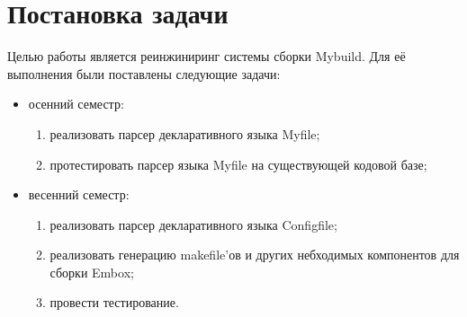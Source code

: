 
\section{Постановка задачи}
\label{sec:task}
Целью работы является реинжиниринг системы сборки Mybuild. Для её выполнения были поставлены следующие задачи:
\begin{itemize}
	\item осенний семестр: \begin{enumerate}
		      \item реализовать парсер декларативного языка Myfile;
		      \item протестировать парсер языка Myfile на существующей кодовой базе;
	      \end{enumerate}
	\item весенний семестр: \begin{enumerate}
		      \item реализовать парсер декларативного языка Configfile;
		      \item реализовать генерацию makefile'ов и других небходимых компонентов для сборки Embox;
		      \item провести тестирование.
	      \end{enumerate}
\end{itemize}
